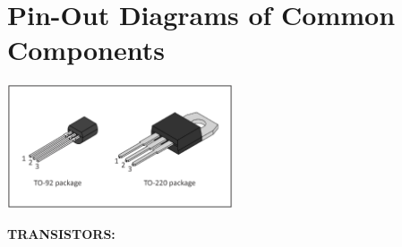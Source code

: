 \section{Pin-Out Diagrams of Common Components}
\label{appendix_pinouts}



\begin{flushright}
\includegraphics[width=0.5\textwidth]{appendices/pinouts/package_pinouts.eps}
\end{flushright}

\vspace{-0.3in}
\textbf{TRANSISTORS:}

